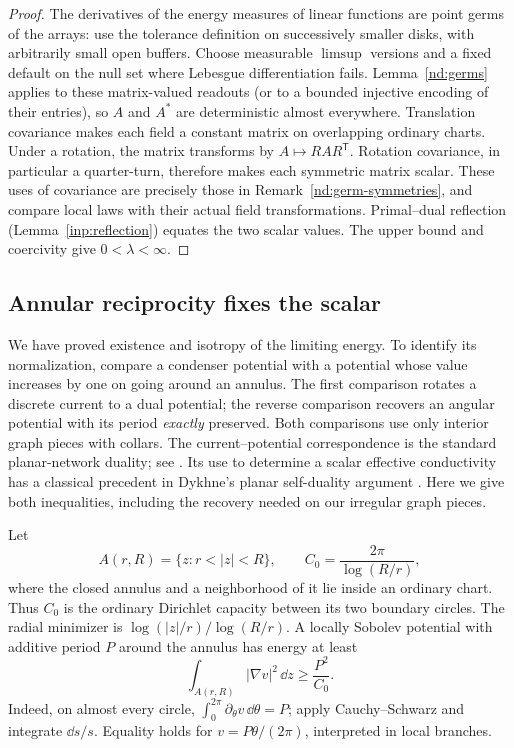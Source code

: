 \begin{proof}
The derivatives of the energy measures of linear functions are point
germs of the arrays: use the tolerance definition on successively
smaller disks, with arbitrarily small open buffers.  Choose measurable
$\limsup$ versions and a fixed default on the null set where
Lebesgue differentiation fails.  Lemma~\ref{nd:germs} applies to these
matrix-valued readouts (or to a bounded injective encoding of their
entries), so $A$ and $A^*$ are deterministic almost everywhere.
Translation covariance makes each field a constant matrix on overlapping
ordinary charts.  Under a rotation, the matrix transforms by
$A\mapsto RAR^{\mathsf T}$.  Rotation covariance, in particular a
quarter-turn, therefore makes each symmetric matrix scalar.  These
uses of covariance are precisely those in
Remark~\ref{nd:germ-symmetries}, and compare local laws with their actual
field transformations.  Primal--dual reflection
(Lemma~\ref{inp:reflection}) equates the two scalar values.  The upper
bound and coercivity give $0<\lambda<\infty$.
\end{proof}

\subsection{Annular reciprocity fixes the scalar}

We have proved existence and isotropy of the limiting energy.  To
identify its normalization, compare a condenser potential with a
potential whose value increases by one on going around an annulus.
The first comparison rotates a discrete current to a dual potential;
the reverse comparison recovers an angular potential with its period
\emph{exactly} preserved.  Both comparisons use only interior graph
pieces with collars.  The current--potential correspondence is the
standard planar-network duality; see \cite[Section~9.2]{LP}.
Its use to determine a scalar effective conductivity has a classical
precedent in Dykhne's planar self-duality argument \cite{Dykhne}.
Here we give both inequalities, including the recovery needed on our
irregular graph pieces.

Let
\[
 A(r,R)=\{z:r<|z|<R\},\qquad
 C_0=\frac{2\pi}{\log(R/r)},
\]
where the closed annulus and a neighborhood of it lie inside an ordinary
chart.  Thus $C_0$ is the ordinary Dirichlet capacity between its two
boundary circles.  The radial minimizer is
$\log(|z|/r)/\log(R/r)$.  A locally Sobolev potential with additive
period $P$ around the annulus has energy at least
\begin{equation}\label{en:period-bound}
             \int_{A(r,R)}|\nabla v|^2\,\dd z
                    \ge\frac{P^2}{C_0}.
\end{equation}
Indeed, on almost every circle,
$\int_0^{2\pi}\partial_\theta v\,\dd\theta=P$; apply
Cauchy--Schwarz and integrate $\dd s/s$.  Equality holds for
$v=P\theta/(2\pi)$, interpreted in local branches.

